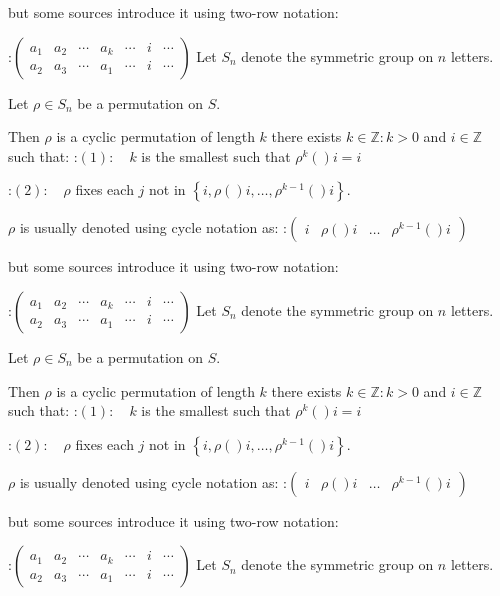 but some sources introduce it using two-row notation:

:$\begin{pmatrix} a_1 & a_2 & \cdots & a_k & \cdots & i & \cdots \\ a_2 & a_3 & \cdots & a_1 & \cdots & i & \cdots \end{pmatrix}$
Let $S_n$ denote the symmetric group on $n$ letters.

Let $\rho \in S_n$ be a permutation on $S$.


Then $\rho$ is a cyclic permutation of length $k$  there exists $k \in \mathbb Z: k > 0$ and $i \in \mathbb Z$ such that:
:$(1): \quad k$ is the smallest such that $\rho^k \left(   \right)i = i$

:$(2): \quad \rho$ fixes each $j$ not in $\left\lbrace i, \rho \left(   \right)i, \ldots, \rho^{k - 1}  \left(   \right)i \right\rbrace$.


$\rho$ is usually denoted using cycle notation as:
:$\begin{pmatrix} i & \rho \left(   \right)i & \ldots & \rho^{k - 1}  \left(   \right)i \end{pmatrix}$

but some sources introduce it using two-row notation:

:$\begin{pmatrix} a_1 & a_2 & \cdots & a_k & \cdots & i & \cdots \\ a_2 & a_3 & \cdots & a_1 & \cdots & i & \cdots \end{pmatrix}$
Let $S_n$ denote the symmetric group on $n$ letters.

Let $\rho \in S_n$ be a permutation on $S$.


Then $\rho$ is a cyclic permutation of length $k$  there exists $k \in \mathbb Z: k > 0$ and $i \in \mathbb Z$ such that:
:$(1): \quad k$ is the smallest such that $\rho^k \left(   \right)i = i$

:$(2): \quad \rho$ fixes each $j$ not in $\left\lbrace i, \rho \left(   \right)i, \ldots, \rho^{k - 1}  \left(   \right)i \right\rbrace$.


$\rho$ is usually denoted using cycle notation as:
:$\begin{pmatrix} i & \rho \left(   \right)i & \ldots & \rho^{k - 1}  \left(   \right)i \end{pmatrix}$

but some sources introduce it using two-row notation:

:$\begin{pmatrix} a_1 & a_2 & \cdots & a_k & \cdots & i & \cdots \\ a_2 & a_3 & \cdots & a_1 & \cdots & i & \cdots \end{pmatrix}$
Let $S_n$ denote the symmetric group on $n$ letters.

